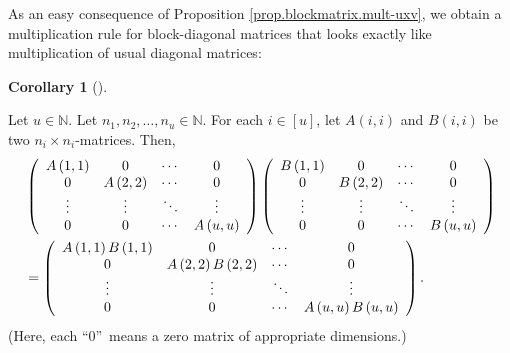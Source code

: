 \documentclass[numbers=enddot,12pt,final,onecolumn,notitlepage]{scrartcl}%
\numberwithin{exer}{subsection}
\theoremstyle{definition}
\newtheorem{coro}[theo]{Corollary}
\newenvironment{corollary}[1][]
{\begin{coro}[#1]\begin{leftbar}}
{\end{leftbar}\end{coro}}
\begin{document}
As an easy consequence of Proposition \ref{prop.blockmatrix.mult-uxv}, we
obtain a multiplication rule for block-diagonal matrices that looks exactly
like multiplication of usual diagonal matrices:

\begin{corollary}
\label{cor.blockmatrix.mult-diag}Let $u\in\mathbb{N}$. Let $n_{1},n_{2}%
,\ldots,n_{u}\in\mathbb{N}$. For each $i\in\left[  u\right]  $, let $A\left(
i,i\right)  $ and $B\left(  i,i\right)  $ be two $n_{i}\times n_{i}$-matrices.
Then,%
\begin{align*}
&  \left(
\begin{array}
[c]{cccc}%
A\left(  1,1\right)  & 0 & \cdots & 0\\
0 & A\left(  2,2\right)  & \cdots & 0\\
\vdots & \vdots & \ddots & \vdots\\
0 & 0 & \cdots & A\left(  u,u\right)
\end{array}
\right)  \left(
\begin{array}
[c]{cccc}%
B\left(  1,1\right)  & 0 & \cdots & 0\\
0 & B\left(  2,2\right)  & \cdots & 0\\
\vdots & \vdots & \ddots & \vdots\\
0 & 0 & \cdots & B\left(  u,u\right)
\end{array}
\right) \\
&  =\left(
\begin{array}
[c]{cccc}%
A\left(  1,1\right)  B\left(  1,1\right)  & 0 & \cdots & 0\\
0 & A\left(  2,2\right)  B\left(  2,2\right)  & \cdots & 0\\
\vdots & \vdots & \ddots & \vdots\\
0 & 0 & \cdots & A\left(  u,u\right)  B\left(  u,u\right)
\end{array}
\right)  .
\end{align*}
(Here, each \textquotedblleft$0$\textquotedblright\ means a zero matrix of
appropriate dimensions.)
\end{corollary}
\end{document}
